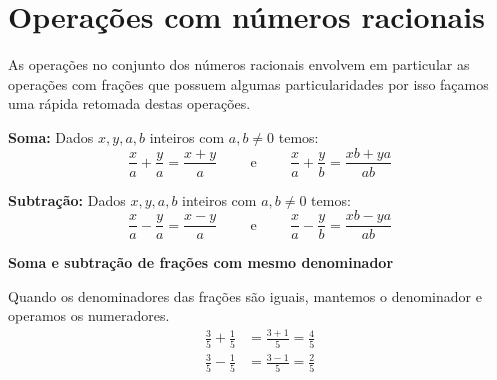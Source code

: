 


 \section{Operações com números racionais} %

 As operações no conjunto dos números racionais envolvem em particular as operações com frações que possuem algumas particularidades por isso façamos uma rápida retomada destas operações.

\begin{obs}
  \textbf{Soma:} Dados $x, y, a, b$ inteiros com $a, b \neq 0$ temos:
 \begin{equation*}
  \frac{x}{a} + \frac{y}{a}= \frac{x+y}{a} \hspace{1cm} \text{e} \hspace{1cm}
  \frac{x}{a} + \frac{y}{b}= \frac{xb + ya}{ab}
\end{equation*}
\end{obs}

\begin{obs}
  \textbf{Subtração:} Dados $x, y, a, b$ inteiros com $a, b \neq 0$ temos:
 \[\frac{x}{a} - \frac{y}{a}= \frac{x-y}{a} \hspace{1cm} \text{e} \hspace{1cm}
 \frac{x}{a} - \frac{y}{b}= \frac{xb - ya}{ab} \]
\end{obs}

 \begin{exem}
  \textbf{Soma e subtração de frações com mesmo denominador}

   Quando os denominadores das frações são iguais, mantemos o denominador e operamos os numeradores.
\begin{align*}
\frac{3}{5} + \frac{1}{5} &= \frac{3+1}{5}= \frac{4}{5}\\[10pt]
\frac{3}{5} - \frac{1}{5} &= \frac{3-1}{5}= \frac{2}{5}
\end{align*}
 \end{exem}

